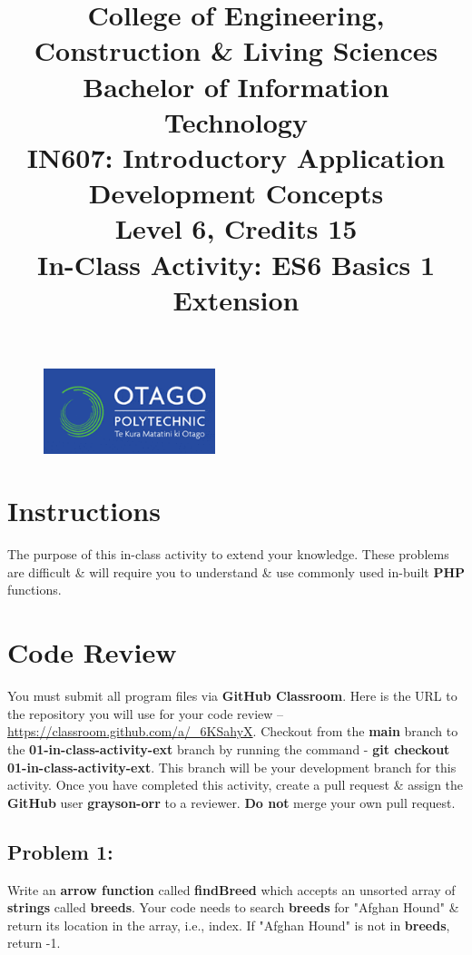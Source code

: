 \documentclass{article}
\author{}
\begin{document}
\begin{figure}
    \centering
    \includegraphics[width=50mm]{../img/logo.png}
\end{figure}

\title{College of Engineering, Construction \& Living Sciences\\Bachelor of Information Technology\\IN607: Introductory Application Development Concepts\\Level 6, Credits 15\\\textbf{In-Class Activity: ES6 Basics 1 Extension}}
\date{}
\maketitle
 
\section*{Instructions}
The purpose of this in-class activity to extend your knowledge. These problems are difficult \& will require you to understand \& use commonly used in-built \textbf{PHP} functions.

\section*{Code Review}
You must submit all program files via \textbf{GitHub Classroom}. Here is the URL to the repository you will use for your code review – \href{https://classroom.github.com/a/_6KSahyX}{https://classroom.github.com/a/_6KSahyX}. Checkout from the \textbf{main} branch to the \textbf{01-in-class-activity-ext} branch by running the command - \textbf{git checkout 01-in-class-activity-ext}. This branch will be your development branch for this activity. Once you have completed this activity, create a pull request \& assign the \textbf{GitHub} user \textbf{grayson-orr} to a reviewer. \textbf{Do not} merge your own pull request.

\subsection*{Problem 1:} 
Write an \textbf{arrow function} called \textbf{findBreed} which accepts an unsorted array of \textbf{strings} called \textbf{breeds}. Your code needs to search \textbf{breeds} for "Afghan Hound" \& return its location in the array, i.e., index. If "Afghan Hound" is not in \textbf{breeds}, return -1.
\end{document}
